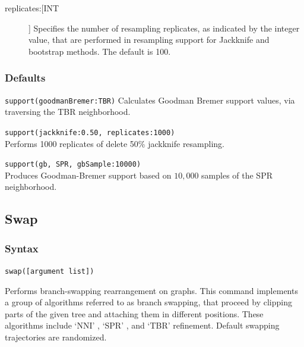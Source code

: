 \begin{description}
		\item[replicates:[INT]] Specifies the number of resampling replicates, as indicated by the 
		integer value, that are performed in resampling support for Jackknife and bootstrap methods. 
		The default is 100.
		
	\end{description}	
		
	\subsubsection{Defaults}
		\texttt{support(goodmanBremer:TBR)} Calculates Goodman Bremer support values, 
		via traversing the TBR neighborhood.
		
		\begin{example}
		
			\item{\texttt{support(jackknife:0.50, replicates:1000)}\\Performs 1000 replicates of 
			delete 50\% jackknife resampling.}
				
			\item{\texttt{support(gb, SPR, gbSample:10000)}\\Produces Goodman-Bremer 
			support based on $10,000$ samples of the SPR neighborhood.}
			
		\end{example}

\subsection{Swap} 
\label{subsec:swap}
	\subsubsection{Syntax}
		\texttt{swap([argument list])}
			
	\begin{phygdescription}
		{Performs branch-swapping rearrangement on graphs. This command implements a 
		group of algorithms referred to as branch swapping, that proceed by clipping
		parts of the given tree and attaching them in different positions. These algorithms 
		include `NNI' \citep{CaminandSokal1965, Robinson1971}, `SPR' \citep{Dayhoff1969}, 
		and `TBR' \citep{Farris1988, swofford1990a} refinement.  Default swapping trajectories 
		are randomized.}
	\end{phygdescription}
		
